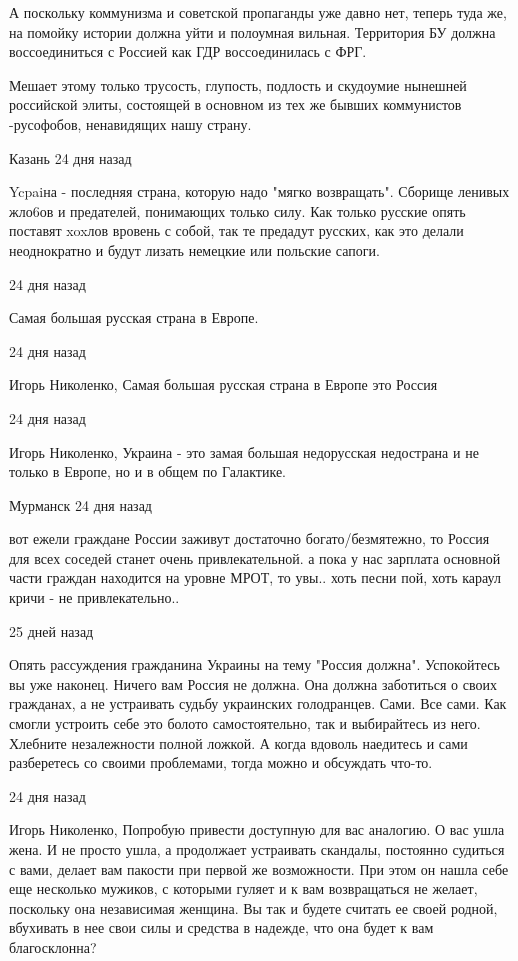\begin{itemize}
А поскольку коммунизма и советской пропаганды уже давно нет, теперь туда же, на
помойку истории должна уйти и полоумная вильная. Территория БУ должна
воссоединиться с Россией как ГДР воссоединилась с ФРГ.

Мешает этому только трусость, глупость, подлость и скудоумие нынешней
российской элиты, состоящей в основном из тех же бывших коммунистов -русофобов,
ненавидящих нашу страну.

 Казань 24 дня назад  

Ycpaiна - последняя страна, которую надо "мягко возвращать".  Сборище ленивых
жло6ов и предателей, понимающих только силу.  Как только русские опять поставят
xoxлов вровень с собой, так те предадут русских, как это делали неоднократно и
будут лизать немецкие или польские сапоги.

 24 дня назад

Самая большая русская страна в Европе.

 24 дня назад

Игорь Николенко, Самая большая русская страна в Европе это Россия

 24 дня назад

Игорь Николенко, Украина - это замая большая недорусская недострана и не только
в Европе, но и в общем по Галактике.

 Мурманск 24 дня назад  

вот ежели граждане России заживут достаточно богато/безмятежно, то Россия для
всех соседей станет очень привлекательной. а пока у нас зарплата основной части
граждан находится на уровне МРОТ, то увы.. хоть песни пой, хоть караул кричи -
не привлекательно..

 25 дней назад  

Опять рассуждения гражданина Украины на тему "Россия должна". Успокойтесь вы
уже наконец. Ничего вам Россия не должна. Она должна заботиться о своих
гражданах, а не устраивать судьбу украинских голодранцев. Сами. Все сами. Как
смогли устроить себе это болото самостоятельно, так и выбирайтесь из него.
Хлебните незалежности полной ложкой. А когда вдоволь наедитесь и сами
разберетесь со своими проблемами, тогда можно и обсуждать что-то.

 24 дня назад

Игорь Николенко, Попробую привести доступную для вас аналогию. О вас ушла жена.
И не просто ушла, а продолжает устраивать скандалы, постоянно судиться с вами,
делает вам пакости при первой же возможности. При этом он нашла себе еще
несколько мужиков, с которыми гуляет и к вам возвращаться не желает, поскольку
она независимая женщина. Вы так и будете считать ее своей родной, вбухивать в
нее свои силы и средства в надежде, что она будет к вам благосклонна?


\end{itemize}
